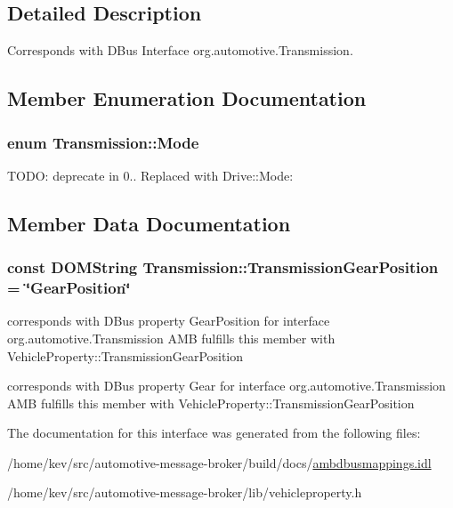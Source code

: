 \subsection{Detailed Description}
Corresponds with D\+Bus Interface org.\+automotive.\+Transmission. 

\subsection{Member Enumeration Documentation}
\hypertarget{interfaceTransmission_a15d0278c6e0dc75cd28f5aeaadb86680}{
\subsubsection[{Mode}]{\setlength{\rightskip}{0pt plus 5cm}enum {\bf Transmission\+::\+Mode}}}\label{interfaceTransmission_a15d0278c6e0dc75cd28f5aeaadb86680}
T\+O\+D\+O\+: deprecate in 0.. Replaced with Drive\+::\+Mode\+: 

\subsection{Member Data Documentation}
\hypertarget{interfaceTransmission_a0271138d40b3619ffcbfe32f2081d516}{
\subsubsection[{Transmission\+Gear\+Position}]{\setlength{\rightskip}{0pt plus 5cm}const D\+O\+M\+String Transmission\+::\+Transmission\+Gear\+Position = \char`\"{}Gear\+Position\char`\"{}}}\label{interfaceTransmission_a0271138d40b3619ffcbfe32f2081d516}


corresponds with D\+Bus property Gear\+Position for interface org.\+automotive.\+Transmission A\+M\+B fulfills this member with Vehicle\+Property\+::\+Transmission\+Gear\+Position 

corresponds with D\+Bus property Gear for interface org.\+automotive.\+Transmission A\+M\+B fulfills this member with Vehicle\+Property\+::\+Transmission\+Gear\+Position 

The documentation for this interface was generated from the following files\+:\begin{DoxyCompactItemize}
\item 
/home/kev/src/automotive-\/message-\/broker/build/docs/\hyperlink{ambdbusmappings_8idl}{ambdbusmappings.\+idl}\item 
/home/kev/src/automotive-\/message-\/broker/lib/vehicleproperty.\+h\end{DoxyCompactItemize}

